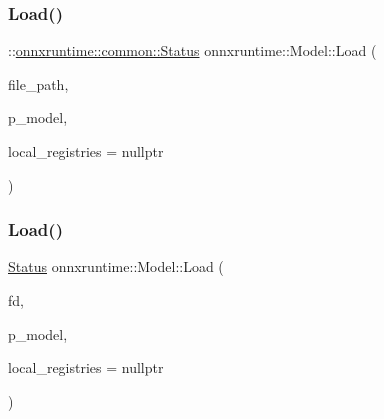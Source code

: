 \subsubsection{\texorpdfstring{Load()}{Load()}\hspace{0.1cm}{\footnotesize\ttfamily [2/5]}}
{\footnotesize\ttfamily \+::\mbox{\hyperlink{classonnxruntime_1_1common_1_1Status}{onnxruntime\+::common\+::\+Status}} onnxruntime\+::\+Model\+::\+Load (\begin{DoxyParamCaption}\item[{const std\+::string \&}]{file\+\_\+path,  }\item[{std\+::shared\+\_\+ptr$<$ \mbox{\hyperlink{classonnxruntime_1_1Model}{Model}} $>$ \&}]{p\+\_\+model,  }\item[{const \mbox{\hyperlink{namespaceonnxruntime_a37a91305e7190e83fa9c66117a6a4746}{I\+Onnx\+Runtime\+Op\+Schema\+Registry\+List}} $\ast$}]{local\+\_\+registries = {\ttfamily nullptr} }\end{DoxyParamCaption})\hspace{0.3cm}{\ttfamily [static]}}

\mbox{\label{classonnxruntime_1_1Model_ae2bc651564a923b007c572bee3f7e69d}} 
\subsubsection{\texorpdfstring{Load()}{Load()}\hspace{0.1cm}{\footnotesize\ttfamily [3/5]}}
{\footnotesize\ttfamily \mbox{\hyperlink{classonnxruntime_1_1common_1_1Status}{Status}} onnxruntime\+::\+Model\+::\+Load (\begin{DoxyParamCaption}\item[{int}]{fd,  }\item[{std\+::shared\+\_\+ptr$<$ \mbox{\hyperlink{classonnxruntime_1_1Model}{Model}} $>$ \&}]{p\+\_\+model,  }\item[{const \mbox{\hyperlink{namespaceonnxruntime_a37a91305e7190e83fa9c66117a6a4746}{I\+Onnx\+Runtime\+Op\+Schema\+Registry\+List}} $\ast$}]{local\+\_\+registries = {\ttfamily nullptr} }\end{DoxyParamCaption})\hspace{0.3cm}{\ttfamily [static]}}

\mbox{\label{classonnxruntime_1_1Model_a61473df4c76c5914c712737804f8c79d}} 
